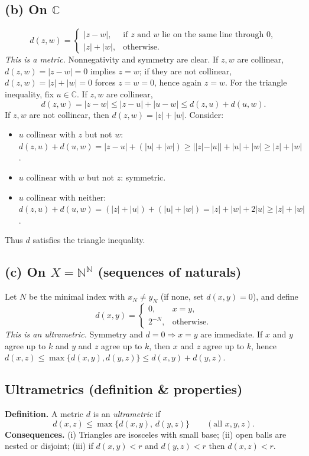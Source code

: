 \documentclass[12pt,a4paper]{article}
\begin{document}
\subsection*{(b) On $\mathbb{C}$}
\[
d(z,w)=
\begin{cases}
|z-w|,& \text{if $z$ and $w$ lie on the same line through $0$},\\
|z|+|w|,& \text{otherwise.}
\end{cases}
\]
\emph{This is a metric.} Nonnegativity and symmetry are clear. If $z,w$ are collinear, $d(z,w)=|z-w|=0$ implies $z=w$; if they are not collinear, $d(z,w)=|z|+|w|=0$ forces $z=w=0$, hence again $z=w$.
For the triangle inequality, fix $u\in\mathbb{C}$. If $z,w$ are collinear,
\[ d(z,w)=|z-w|\le |z-u|+|u-w|\le d(z,u)+d(u,w). \]
If $z,w$ are not collinear, then $d(z,w)=|z|+|w|$. Consider:
\begin{itemize}
\item $u$ collinear with $z$ but not $w$:
$d(z,u)+d(u,w)=|z-u|+(|u|+|w|)\ge ||z|-|u||+|u|+|w|\ge |z|+|w|$.
\item $u$ collinear with $w$ but not $z$: symmetric.
\item $u$ collinear with neither:
$d(z,u)+d(u,w)=(|z|+|u|)+(|u|+|w|)=|z|+|w|+2|u|\ge |z|+|w|$.
\end{itemize}
Thus $d$ satisfies the triangle inequality.

\subsection*{(c) On $X=\mathbb{N}^{\mathbb{N}}$ (sequences of naturals)}
Let $N$ be the minimal index with $x_N\ne y_N$ (if none, set $d(x,y)=0$), and define
\[
d(x,y)=
\begin{cases}
0,& x=y,\\
2^{-N},& \text{otherwise.}
\end{cases}
\]
\emph{This is an ultrametric.} Symmetry and $d=0\Rightarrow x=y$ are immediate.
If $x$ and $y$ agree up to $k$ and $y$ and $z$ agree up to $k$, then $x$ and $z$ agree up to $k$, hence
$d(x,z)\le \max\{d(x,y),d(y,z)\}\le d(x,y)+d(y,z)$.

\subsection*{Ultrametrics (definition \& properties)}
\textbf{Definition.} A metric $d$ is an \emph{ultrametric} if
\[
d(x,z)\le \max\{d(x,y),\,d(y,z)\}\qquad(\text{all }x,y,z).
\]
\textbf{Consequences.} (i) Triangles are isosceles with small base; (ii) open balls are nested or disjoint;
(iii) if $d(x,y)<r$ and $d(y,z)<r$ then $d(x,z)<r$.
\end{document}
